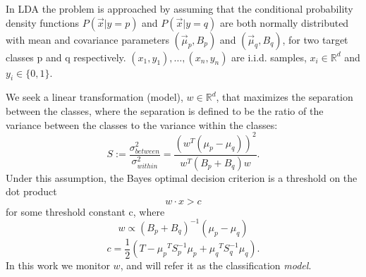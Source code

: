 \documentclass{sig-alternate-05-2015}
\begin{document}
In LDA the problem is approached by assuming that the conditional probability
density functions $P(\vec x|y=p)$ and $P(\vec x|y=q)$ are both normally distributed with
mean and covariance parameters $\left(\vec \mu_p, B_p\right)$ and
$\left(\vec \mu_q, B_q\right)$, for two target classes p and q respectively.
${(x_1,y_1),\ldots,(x_n,y_n)}$ are i.i.d. samples, $x_i \in \mathbb{R}^d$
and $y_i \in \{0,1\}$.

We seek a linear transformation (model), $w \in \mathbb{R}^d $,
that maximizes the separation between the classes, where the separation is
defined to be the ratio of the variance between the classes to the variance
within the classes:
\begin{equation*}
S := \frac{\sigma^2_{between}}{\sigma^2_{within}} = \frac{(w^T (\mu_p -
\mu_q))^2}{w^T(B_p+B_q)w}.
\end{equation*}
Under this assumption, the Bayes optimal decision criterion is a threshold on the
dot product
\begin{equation*} \label{eq:decision}
w \cdot x > c
\end{equation*}
for some threshold constant c, where
\begin{equation} \label{eq:w}
w \propto (B_p+B_q)^{-1}(\mu_p - \mu_q)
\end{equation}
\begin{equation} \label{eq:c}
c = \frac{1}{2}(T-{\mu_p}^T S_p^{-1} {\mu_p}+{\mu_q}^T S_q^{-1} {\mu_q}).
\end{equation}
In this work we monitor $w$, and will refer it as the
classification \textit{model}.
\end{document}
